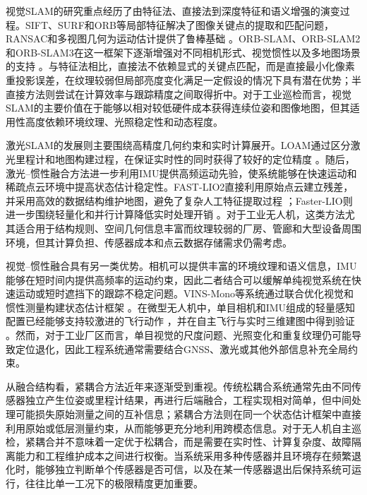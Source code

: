 视觉SLAM的研究重点经历了由特征法、直接法到深度特征和语义增强的演变过程。SIFT、SURF和ORB等局部特征解决了图像关键点的提取和匹配问题，RANSAC和多视图几何为运动估计提供了鲁棒基础
\cite{lowe2004distinctive,rublee2011orb,fischler1981random,hartley2003multiple}。ORB-SLAM、ORB-SLAM2和ORB-SLAM3在这一框架下逐渐增强对不同相机形式、视觉惯性以及多地图场景的支持
\cite{mur2015orb,mur2017orb,campos2021orb}。与特征法相比，直接法不依赖显式的关键点匹配，而是直接最小化像素重投影误差，在纹理较弱但局部亮度变化满足一定假设的情况下具有潜在优势；半直接方法则尝试在计算效率与跟踪精度之间取得折中。对于工业巡检而言，视觉SLAM的主要价值在于能够以相对较低硬件成本获得连续位姿和图像地图，但其适用性高度依赖环境纹理、光照稳定性和动态程度。

激光SLAM的发展则主要围绕高精度几何约束和实时计算展开。LOAM通过区分激光里程计和地图构建过程，在保证实时性的同时获得了较好的定位精度
\cite{zhang2014loam}。随后，激光--惯性融合方法进一步利用IMU提供高频运动先验，使系统能够在快速运动和稀疏点云环境中提高状态估计稳定性。FAST-LIO2直接利用原始点云建立残差，并采用高效的数据结构维护地图，避免了复杂人工特征提取过程
\cite{xu2022fast}；Faster-LIO则进一步围绕轻量化和并行计算降低实时处理开销
\cite{bai2022fasterlio}。对于工业无人机，这类方法尤其适合用于结构规则、空间几何信息丰富而纹理较弱的厂房、管廊和大型设备周围环境，但其计算负担、传感器成本和点云数据存储需求仍需考虑。

视觉--惯性融合具有另一类优势。相机可以提供丰富的环境纹理和语义信息，IMU能够在短时间内提供高频率的运动约束，因此二者结合可以缓解单纯视觉系统在快速运动或短时遮挡下的跟踪不稳定问题。VINS-Mono等系统通过联合优化视觉和惯性测量构建状态估计框架
\cite{qin2018vins}。在微型无人机中，单目相机和IMU组成的轻量感知配置已经能够支持较激进的飞行动作
\cite{loianno2017estimation}，并在自主飞行与实时三维建图中得到验证
\cite{faessler2016autonomous}。然而，对于工业厂区而言，单目视觉的尺度问题、光照变化和重复纹理仍可能导致定位退化，因此工程系统通常需要结合GNSS、激光或其他外部信息补充全局约束。

从融合结构看，紧耦合方法近年来逐渐受到重视。传统松耦合系统通常先由不同传感器独立产生位姿或里程计结果，再进行后端融合，工程实现相对简单，但中间处理可能损失原始测量之间的互补信息；紧耦合方法则在同一个状态估计框架中直接利用原始或低层测量约束，从而能够更充分地利用跨模态信息。对于无人机自主巡检，紧耦合并不意味着一定优于松耦合，而是需要在实时性、计算复杂度、故障隔离能力和工程维护成本之间进行权衡。当系统采用多种传感器并且环境存在频繁退化时，能够独立判断单个传感器是否可信，以及在某一传感器退出后保持系统可运行，往往比单一工况下的极限精度更加重要。

